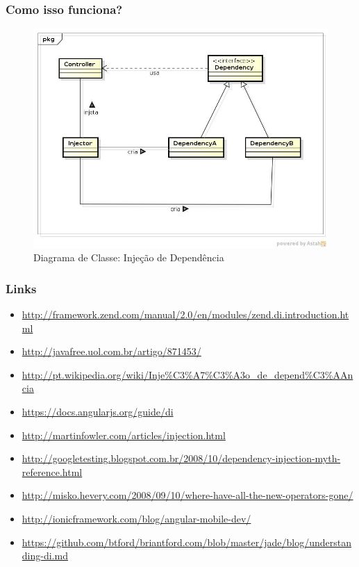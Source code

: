 \begin{frame}\frametitle{Como isso funciona?}

\begin{figure}
    \includegraphics[scale=0.3]{img/diagrama-dependency-injection.jpg}
    \caption{Diagrama de Classe: Injeção de Dependência}
\end{figure}

\end{frame}

\begin{frame}[fragile]\frametitle{Links}

\begin{itemize}
\item
  \url{http://framework.zend.com/manual/2.0/en/modules/zend.di.introduction.html}
\item
  \url{http://javafree.uol.com.br/artigo/871453/}
\item
  \url{http://pt.wikipedia.org/wiki/Inje%C3%A7%C3%A3o_de_depend%C3%AAncia}
\item
  \url{https://docs.angularjs.org/guide/di}
\item
  \url{http://martinfowler.com/articles/injection.html}
\item
  \url{http://googletesting.blogspot.com.br/2008/10/dependency-injection-myth-reference.html}
\item
  \url{http://misko.hevery.com/2008/09/10/where-have-all-the-new-operators-gone/}
\item
  \url{http://ionicframework.com/blog/angular-mobile-dev/}
\item
  \url{https://github.com/btford/briantford.com/blob/master/jade/blog/understanding-di.md}
\end{itemize}
\end{frame}
